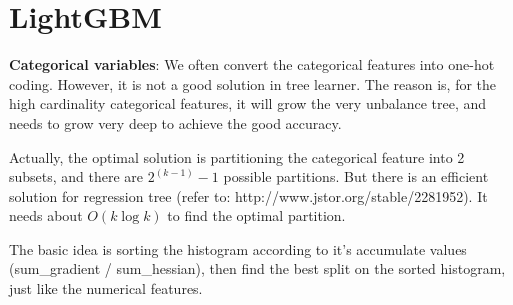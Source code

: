\documentclass{article}
\begin{document}
\section{LightGBM}

\textbf{Categorical variables}:
We often convert the categorical features into one-hot coding. However, it is not a good solution in tree learner. The reason is, for the high cardinality categorical features, it will grow the very unbalance tree, and needs to grow very deep to achieve the good accuracy.

Actually, the optimal solution is partitioning the categorical feature into 2 subsets, and there are $2^{(k-1)} - 1$ possible partitions. But there is an efficient solution for regression tree (refer to: http://www.jstor.org/stable/2281952). It needs about $O(k\log k)$ to find the optimal partition.

The basic idea is sorting the histogram according to it's accumulate values (sum\_gradient / sum\_hessian), then find the best split on the sorted histogram, just like the numerical features.
\end{document}
